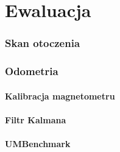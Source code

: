 \chapter{Ewaluacja}

\subsection{Skan otoczenia}

\subsection{Odometria}
\subsubsection{Kalibracja magnetometru}
\label{sec:mag_cal}

\subsubsection{Filtr Kalmana}
\label{sec:kalman}

\subsubsection{UMBenchmark\cite{Borenstein1995}}



